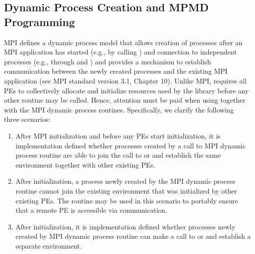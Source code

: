 

\subsection{Dynamic Process Creation and MPMD Programming}
\label{subsec:interoperability:mpmd}

MPI defines a dynamic process model that allows creation of processes after
an MPI application has started (e.g., by calling ) and
connection to independent processes (e.g., through 
and )
and provides a mechanism to establish communication
between the newly created processes and the existing MPI application (see
MPI standard version 3.1, Chapter 10).
Unlike MPI, \openshmem requires all PEs to collectively allocate and initialize
resources used by the \openshmem library before any other \openshmem routine may
be called. Hence, attention must be paid when using \openshmem together with the
MPI dynamic process routines. Specifically, we clarify the following three scenarios:

\begin{enumerate}
\item After MPI initialization and before any PEs start \openshmem initialization,
it is implementation defined whether processes created by a call to MPI dynamic
process routine are able to join the call to  or
 and establish the same \openshmem environment together
with other existing PEs.

\item After \openshmem initialization, a process newly created by
the MPI dynamic process routine cannot join the existing \openshmem environment
that was initialized by other existing PEs. The  routine
may be used in this scenario to portably ensure that a remote PE is accessible
via \openshmem communication.

\item After \openshmem initialization, it is implementation defined whether
processes newly created by MPI dynamic process routine can make a call to
 or  and establish a separate
\openshmem environment.
\end{enumerate}


